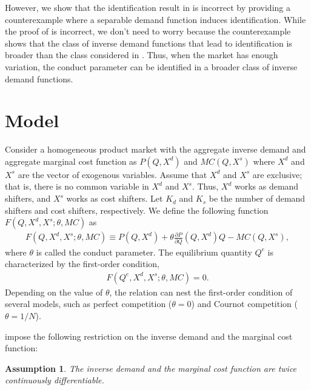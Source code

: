 \documentclass[11pt, a4paper]{article}
\newtheorem{assumption}{Assumption}
\theoremstyle{remark}
\begin{document}
However, we show that the identification result in \citet{lau1982identifying} is incorrect by providing a counterexample where a separable demand function induces identification.
While the proof of \citet{lau1982identifying} is incorrect, we don't need to worry because the counterexample shows that the class of inverse demand functions that lead to identification is broader than the class considered in \citet{lau1982identifying}.
Thus, when the market has enough variation, the conduct parameter can be identified in a broader class of inverse demand functions.


\section{Model}
Consider a homogeneous product market with the aggregate inverse demand and aggregate marginal cost function as $P(Q, X^{d})$ and $MC(Q, X^{s})$ where $X^{d}$ and $X^{s}$ are the vector of exogenous variables.
Assume that $X^{d}$ and $X^{s}$ are exclusive; that is, there is no common variable in $X^{d}$ and $X^{s}$.
Thus, $X^{d}$ works as demand shifters, and $X^{s}$ works as cost shifters. 
Let $K_d$ and $K_s$ be the number of demand shifters and cost shifters, respectively.
We define the following function $F(Q, X^{d}, X^{s}; \theta, MC)$ as
\begin{align}
    F(Q, X^{d}, X^{s}; \theta, MC) \equiv P(Q, X^{d}) + \theta \frac{\partial P}{\partial Q}(Q, X^{d}) Q - MC(Q, X^{s}),
\end{align}
where $\theta$ is called the conduct parameter. 
The equilibrium quantity $Q^e$ is characterized by the first-order condition,
\begin{align}
    F(Q^e, X^{d}, X^{s}; \theta, MC) = 0.
\end{align}
Depending on the value of $\theta$, the relation can nest the first-order condition of several models, such as perfect competition ($\theta=0$) and Cournot competition ($\theta=1/N$).

\citet{lau1982identifying} impose the following restriction on the inverse demand and the marginal cost function:
\begin{assumption}\label{assumption:twice_differentiable}
    The inverse demand and the marginal cost function are twice continuously differentiable.
\end{assumption}
\end{document}
